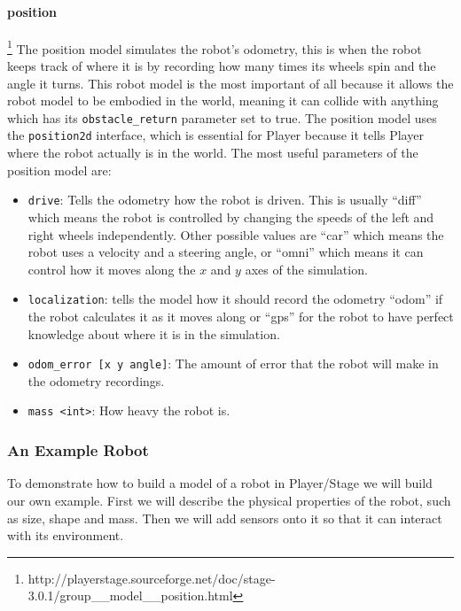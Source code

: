 \documentclass[a4paper]{report}
\newcommand{\plst}{Player/Stage\xspace}
\newcommand{\pl}{Player\xspace}
\begin{document}
\paragraph{position}\footnote{http://playerstage.sourceforge.net/doc/stage-3.0.1/group\_\_model\_\_position.html}\label{sec:position}
The position model simulates the robot's odometry, this is when the robot keeps track of where it is by recording how many times its wheels spin and the angle it turns. This robot model is the most important of all because it allows the robot model to be embodied in the world, meaning it can collide with anything which has its \verb|obstacle_return| parameter set to true. The position model uses the \verb|position2d| interface, which is essential for \pl because it tells \pl where the robot actually is in the world.
The most useful parameters of the position model are:
\begin{itemize}
\item \verb|drive|: Tells the odometry how the robot is driven. This is usually ``diff'' which means the robot is controlled by changing the speeds of the left and right wheels independently. Other possible values are ``car'' which means the robot uses a velocity and a steering angle, or ``omni'' which means it can control how it moves along the $x$ and $y$ axes of the simulation.
\item \verb|localization|: tells the model how it should record the odometry ``odom'' if the robot calculates it as it moves along or ``gps'' for the robot to have perfect knowledge about where it is in the simulation. 
\item \verb|odom_error [x y angle]|: The amount of error that the robot will make in the odometry recordings.
\item \verb|mass <int>|: How heavy the robot is.
\end{itemize}


\subsubsection{An Example Robot} \label{sec:exampleRobot}

To demonstrate how to build a model of a robot in \plst we will build our own example. First we will describe the physical properties of the robot, such as size, shape and mass. Then we will add sensors onto it so that it can interact with its environment.
\end{document}
